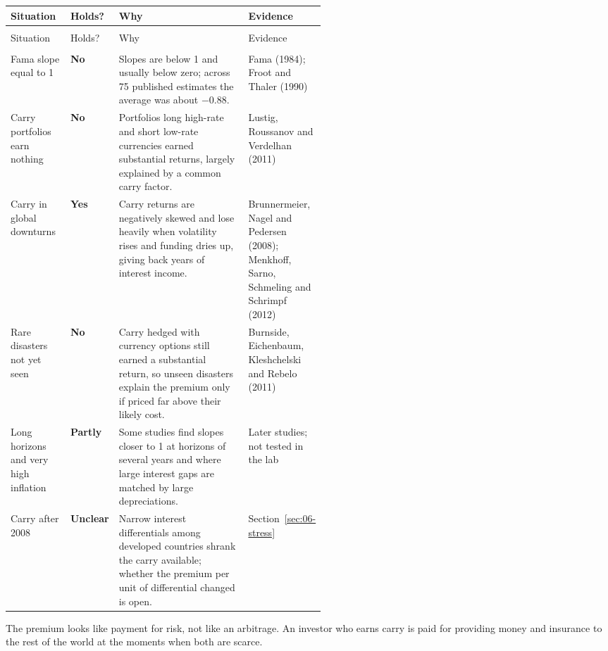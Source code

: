 {\small
\begin{longtable}{@{}>{\raggedright\arraybackslash}p{0.19\linewidth}>{\raggedright\arraybackslash}p{0.10\linewidth}>{\raggedright\arraybackslash}p{}>{\raggedright\arraybackslash}p{0.23\linewidth}@{}}
\toprule
Situation & Holds? & Why & Evidence \\
\midrule
\endfirsthead
\multicolumn{4}{@{}l}{\emph{(continued)}} \\
\toprule
Situation & Holds? & Why & Evidence \\
\midrule
\endhead
\midrule
\multicolumn{4}{r@{}}{\emph{(continued on the next page)}} \\
\endfoot
\bottomrule
\endlastfoot
Fama slope equal to 1 & \textbf{No} & Slopes are below 1 and usually below zero; across 75 published estimates the average was about $-0.88$. & Fama (1984); Froot and Thaler (1990) \\
\addlinespace[3pt]
Carry portfolios earn nothing & \textbf{No} & Portfolios long high-rate and short low-rate currencies earned substantial returns, largely explained by a common carry factor. & Lustig, Roussanov and Verdelhan (2011) \\
\addlinespace[3pt]
Carry in global downturns & \textbf{Yes} & Carry returns are negatively skewed and lose heavily when volatility rises and funding dries up, giving back years of interest income. & Brunnermeier, Nagel and Pedersen (2008); Menkhoff, Sarno, Schmeling and Schrimpf (2012) \\
\addlinespace[3pt]
Rare disasters not yet seen & \textbf{No} & Carry hedged with currency options still earned a substantial return, so unseen disasters explain the premium only if priced far above their likely cost. & Burnside, Eichenbaum, Kleshchelski and Rebelo (2011) \\
\addlinespace[3pt]
Long horizons and very high inflation & \textbf{Partly} & Some studies find slopes closer to 1 at horizons of several years and where large interest gaps are matched by large depreciations. & Later studies; not tested in the lab \\
\addlinespace[3pt]
Carry after 2008 & \textbf{Unclear} & Narrow interest differentials among developed countries shrank the carry available; whether the premium per unit of differential changed is open. & Section~\ref{sec:06-stress} \\
\end{longtable}
}

The premium looks like payment for risk, not like an arbitrage. An investor who earns carry is paid for providing money and insurance to the rest of the world at the moments when both are scarce.

